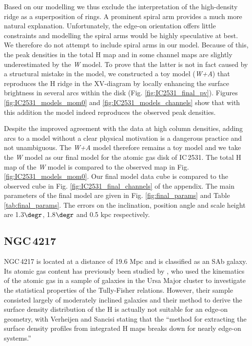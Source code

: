 \documentclass{aa}
\begin{document}
\par
Based on our modelling we thus exclude the interpretation of the high-density ridge as a superposition of rings. A prominent spiral arm provides a much more natural explanation. Unfortunately, the edge-on orientation offers little constraints and modelling the spiral arms would be highly speculative at best. We therefore do not attempt to include spiral arms in our model. Because of this, the peak densities in the total H{} map and in some channel maps are slightly underestimated by the \textit{W} model. To prove that the latter is not in fact caused by a structural mistake in the model, we constructed a toy model (\textit{W+A}) that reproduces the H{} ridge in the XV-diagram by locally enhancing the surface brightness in several arcs within the disk (Fig. \ref{fig:IC2531_final_pv}). Figures \ref{fig:IC2531_models_mom0} and \ref{fig:IC2531_models_channels} show that with this addition the model indeed reproduces the observed peak densities.
\par
Despite the improved agreement with the data at high column densities, adding arcs to a model without a clear physical motivation is a dangerous practice and not unambiguous. The \textit{W+A} model therefore remains a toy model and we take the \textit{W} model as our final model for the atomic gas disk of IC\,2531. The total H{} map of the \textit{W} model is compared to the observed map in Fig. \ref{fig:IC2531_models_mom0}. Our final model data cube is compared to the observed cube in Fig. \ref{fig:IC2531_final_channels} of the appendix. The main parameters of the final model are given in Fig. \ref{fig:final_params} and Table \ref{tab:final_params}. The errors on the inclination, position angle and scale height are 1.3$\degr$, 1.8$\degr$ and 0.5 kpc respectively.


\subsection{NGC\,4217}

NGC\,4217 is located at a distance of 19.6 Mpc and is classified as an SAb galaxy. Its atomic gas content has previously been studied by \cite{verheijen01,verheijen01b}, who used the kinematics of the atomic gas in a sample of galaxies in the Ursa Major cluster to investigate the statistical properties of the Tully-Fisher relations. However, their sample consisted largely of moderately inclined galaxies and their method to derive the surface density distribution of the H{} is actually not suitable for an edge-on geometry, with Verheijen and Sancisi stating that the ``method for extracting the surface density profiles from integrated H{} maps breaks down for nearly edge-on systems.''
\end{document}
